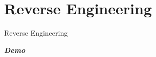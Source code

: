 \section{Reverse Engineering}

\begin{frame}{Reverse Engineering}
  
  \begin{center}
  \Huge \emph{\textbf{Demo}}
  \end{center}
  
\end{frame}
